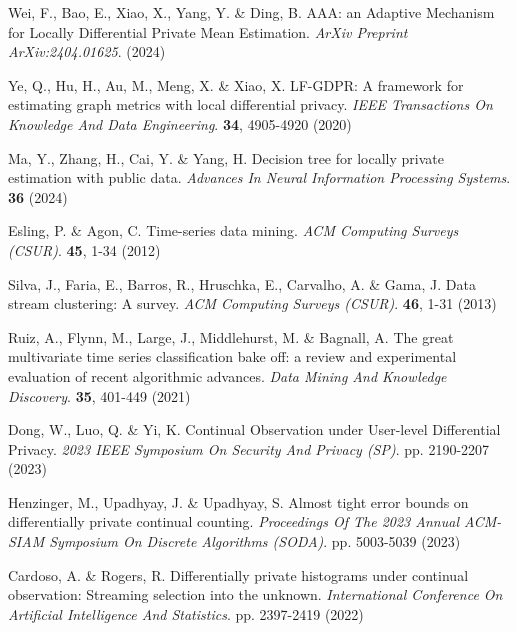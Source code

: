 \begin{thebibliography}{10}
\begin{small}
Wei, F., Bao, E., Xiao, X., Yang, Y. \& Ding, B. AAA: an Adaptive Mechanism for Locally Differential Private Mean Estimation. {\em ArXiv Preprint ArXiv:2404.01625}. (2024)
	
Ye, Q., Hu, H., Au, M., Meng, X. \& Xiao, X. LF-GDPR: A framework for estimating graph metrics with local differential privacy. {\em IEEE Transactions On Knowledge And Data Engineering}. \textbf{34}, 4905-4920 (2020)

Ma, Y., Zhang, H., Cai, Y. \& Yang, H. Decision tree for locally private estimation with public data. {\em Advances In Neural Information Processing Systems}. \textbf{36} (2024)

Esling, P. \& Agon, C. Time-series data mining. {\em ACM Computing Surveys (CSUR)}. \textbf{45}, 1-34 (2012)


Silva, J., Faria, E., Barros, R., Hruschka, E., Carvalho, A. \& Gama, J. Data stream clustering: A survey. {\em ACM Computing Surveys (CSUR)}. \textbf{46}, 1-31 (2013)	

Ruiz, A., Flynn, M., Large, J., Middlehurst, M. \& Bagnall, A. The great multivariate time series classification bake off: a review and experimental evaluation of recent algorithmic advances. {\em Data Mining And Knowledge Discovery}. \textbf{35}, 401-449 (2021)







Dong, W., Luo, Q. \& Yi, K. Continual Observation under User-level Differential Privacy. {\em 2023 IEEE Symposium On Security And Privacy (SP)}. pp. 2190-2207 (2023)

Henzinger, M., Upadhyay, J. \& Upadhyay, S. Almost tight error bounds on differentially private continual counting. {\em Proceedings Of The 2023 Annual ACM-SIAM Symposium On Discrete Algorithms (SODA)}. pp. 5003-5039 (2023)

Cardoso, A. \& Rogers, R. Differentially private histograms under continual observation: Streaming selection into the unknown. {\em International Conference On Artificial Intelligence And Statistics}. pp. 2397-2419 (2022)


\end{small}
\end{thebibliography}

